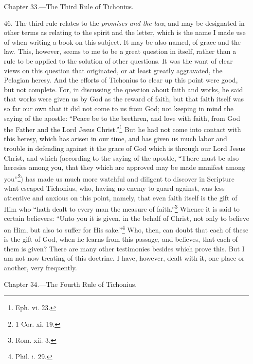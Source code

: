 Chapter 33.—The Third Rule of Tichonius.

46. The third rule relates to the \emph{promises and the law}, and may be designated in other terms as relating to the spirit and the letter, which is the name I made use of when writing a book on this subject. It may be also named, of grace and the law. This, however, seems to me to be a great question in itself, rather than a rule to be applied to the solution of other questions. It was the want of clear views on this question that originated, or at least greatly aggravated, the Pelagian heresy. And the efforts of Tichonius to clear up this point were good, but not complete. For, in discussing the question about faith and works, he said that works were given us by God as the reward of faith, but that faith itself was so far our own that it did not come to us from God; not keeping in mind the saying of the apostle: “Peace be to the brethren, and love with faith, from God the Father and the Lord Jesus Christ.”\footnote{Eph. vi. 23.} But he had not come into contact with this heresy, which has arisen in our time, and has given us much labor and trouble in defending against it the grace of God which is through our Lord Jesus Christ, and which (according to the saying of the apostle, “There must be also heresies among you, that they which are approved may be made manifest among you”\footnote{1 Cor. xi. 19.}) has made us much more watchful and diligent to discover in Scripture what escaped Tichonius, who, having no enemy to guard against, was less attentive and anxious on this point, namely, that even faith itself is the gift of Him who “hath dealt to every man the measure of faith.”\footnote{Rom. xii. 3.} Whence it is said to certain believers: “Unto you it is given, in the behalf of Christ, not only to believe on Him, but also to suffer for His sake.”\footnote{Phil. i. 29.} Who, then, can doubt that each of these is the gift of God, when he learns from this passage, and believes, that each of them is given? There are many other testimonies besides which prove this. But I am not now treating of this doctrine. I have, however, dealt with it, one place or another, very frequently.


Chapter 34.—The Fourth Rule of Tichonius.


